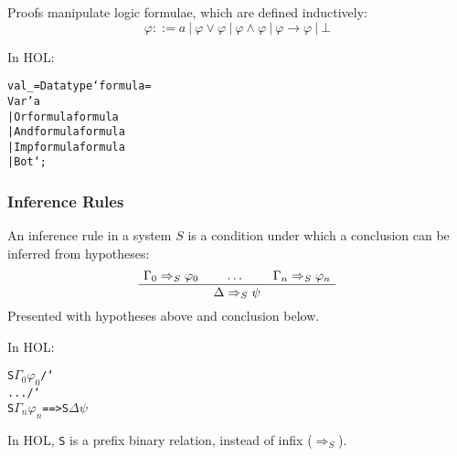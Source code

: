 \documentclass[english,svgnames,hide notes,12pt]{beamer}
\theoremstyle{definition}
\theoremstyle{remark}
\newtheorem{notn}{Notation}
\begin{document}
\begin{frame}[fragile]
    Proofs manipulate logic formulae, which are defined inductively:
    \[ \varphi ::= a ~|~ \varphi \lor \varphi ~|~ \varphi \land \varphi ~|~ \varphi \to \varphi ~|~ \bot \]

    \bigskip
    In HOL:
    \small
    \begin{alltt}
        val _ = Datatype `formula =
            Var 'a
            | Or formula formula
            | And formula formula
            | Imp formula formula
            | Bot`;
    \end{alltt}
\end{frame}
\newcommand{\bs}{\char`\\}
\begin{frame}[fragile]
    \frametitle{Inference Rules}
    An inference rule in a system $S$ is a condition under which a conclusion can be inferred from hypotheses:
    \[
        \AxiomC{$\Gamma_0 \Rightarrow_S \varphi_0$}
        \AxiomC{$\dots$}
        \AxiomC{$\Gamma_n \Rightarrow_S \varphi_n$}  
        \TrinaryInfC{$\Delta \Rightarrow_S \psi$}
        \DisplayProof
    \]
    Presented with hypotheses above and conclusion below.

    \bigskip
    In HOL:
    \begin{alltt}
        S \(\Gamma_0\) \(\varphi_0\) /\bs{} ... /\bs{} S \(\Gamma_n\) \(\varphi_n\) ==> S \(\Delta\) \(\psi\)
    \end{alltt}

    In HOL, \texttt{S} is a prefix binary relation, instead of infix ($\Rightarrow_S$).
\end{frame}
\end{document}
